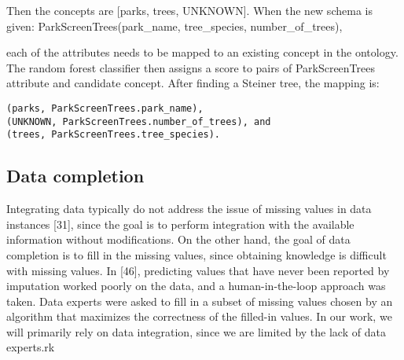 Then the concepts are [parks, trees, UNKNOWN]. When the new schema is given:
ParkScreenTrees(park\_name, tree\_species, number\_of\_trees),

each of the attributes needs to be mapped to an existing concept in the ontology. The random forest classifier then assigns a score to pairs of ParkScreenTrees attribute and candidate concept. After finding a Steiner tree, the mapping is:

\begin{lstlisting}
(parks, ParkScreenTrees.park_name),
(UNKNOWN, ParkScreenTrees.number_of_trees), and
(trees, ParkScreenTrees.tree_species).
\end{lstlisting}

\subsection{Data completion}

Integrating data typically do not address the issue of missing values in data instances [31], since the goal is to perform integration with the available information without modifications. On the other hand, the goal of data completion is to fill in the missing values, since obtaining knowledge is difficult with missing values. In [46], predicting values that have never been reported by imputation worked poorly on the data, and a human-in-the-loop approach was taken. Data experts were asked to fill in a subset of missing values chosen by an algorithm that maximizes the correctness of the filled-in values. In our work, we will primarily rely on data integration, since we are limited by the lack of data experts.rk

